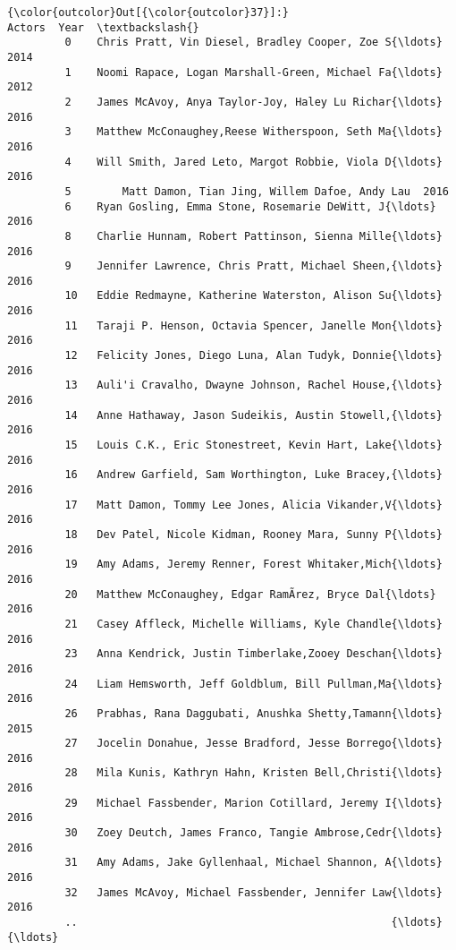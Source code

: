 \documentclass[11pt]{article}
\begin{document}
\begin{Verbatim}[commandchars=\\\{\}]
{\color{outcolor}Out[{\color{outcolor}37}]:}                                                 Actors  Year  \textbackslash{}
         0    Chris Pratt, Vin Diesel, Bradley Cooper, Zoe S{\ldots}  2014   
         1    Noomi Rapace, Logan Marshall-Green, Michael Fa{\ldots}  2012   
         2    James McAvoy, Anya Taylor-Joy, Haley Lu Richar{\ldots}  2016   
         3    Matthew McConaughey,Reese Witherspoon, Seth Ma{\ldots}  2016   
         4    Will Smith, Jared Leto, Margot Robbie, Viola D{\ldots}  2016   
         5        Matt Damon, Tian Jing, Willem Dafoe, Andy Lau  2016   
         6    Ryan Gosling, Emma Stone, Rosemarie DeWitt, J{\ldots}  2016   
         8    Charlie Hunnam, Robert Pattinson, Sienna Mille{\ldots}  2016   
         9    Jennifer Lawrence, Chris Pratt, Michael Sheen,{\ldots}  2016   
         10   Eddie Redmayne, Katherine Waterston, Alison Su{\ldots}  2016   
         11   Taraji P. Henson, Octavia Spencer, Janelle Mon{\ldots}  2016   
         12   Felicity Jones, Diego Luna, Alan Tudyk, Donnie{\ldots}  2016   
         13   Auli'i Cravalho, Dwayne Johnson, Rachel House,{\ldots}  2016   
         14   Anne Hathaway, Jason Sudeikis, Austin Stowell,{\ldots}  2016   
         15   Louis C.K., Eric Stonestreet, Kevin Hart, Lake{\ldots}  2016   
         16   Andrew Garfield, Sam Worthington, Luke Bracey,{\ldots}  2016   
         17   Matt Damon, Tommy Lee Jones, Alicia Vikander,V{\ldots}  2016   
         18   Dev Patel, Nicole Kidman, Rooney Mara, Sunny P{\ldots}  2016   
         19   Amy Adams, Jeremy Renner, Forest Whitaker,Mich{\ldots}  2016   
         20   Matthew McConaughey, Edgar RamÃ­rez, Bryce Dal{\ldots}  2016   
         21   Casey Affleck, Michelle Williams, Kyle Chandle{\ldots}  2016   
         23   Anna Kendrick, Justin Timberlake,Zooey Deschan{\ldots}  2016   
         24   Liam Hemsworth, Jeff Goldblum, Bill Pullman,Ma{\ldots}  2016   
         26   Prabhas, Rana Daggubati, Anushka Shetty,Tamann{\ldots}  2015   
         27   Jocelin Donahue, Jesse Bradford, Jesse Borrego{\ldots}  2016   
         28   Mila Kunis, Kathryn Hahn, Kristen Bell,Christi{\ldots}  2016   
         29   Michael Fassbender, Marion Cotillard, Jeremy I{\ldots}  2016   
         30   Zoey Deutch, James Franco, Tangie Ambrose,Cedr{\ldots}  2016   
         31   Amy Adams, Jake Gyllenhaal, Michael Shannon, A{\ldots}  2016   
         32   James McAvoy, Michael Fassbender, Jennifer Law{\ldots}  2016   
         ..                                                 {\ldots}   {\ldots}   

\end{Verbatim}
\end{document}
